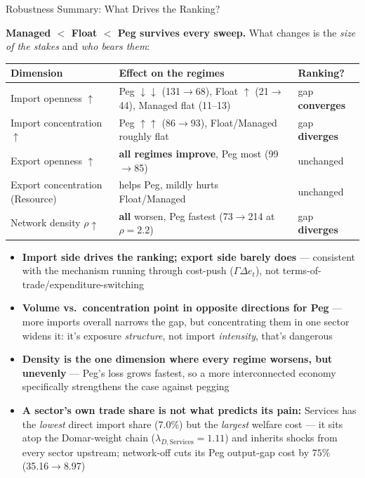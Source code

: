 \begin{frame}{Robustness Summary: What Drives the Ranking?}
\hypertarget{robustsummary}{}

\vspace{-6pt}
{\scriptsize \textbf{Managed $<$ Float $<$ Peg survives every sweep.} What changes is the \emph{size of the stakes} and \emph{who bears them}:}

\vspace{3pt}
{\tiny
\renewcommand{\arraystretch}{1.25}
\begin{tabular}{@{}p{2.2cm}p{4.9cm}p{2.4cm}@{}}
\toprule
\textbf{Dimension} & \textbf{Effect on the regimes} & \textbf{Ranking?} \\
\midrule
Import openness $\uparrow$ & Peg $\downarrow\downarrow$ (131$\to$68), Float $\uparrow$ (21$\to$44), Managed flat (11--13) & gap \textbf{converges} \\
Import concentration $\uparrow$ & Peg $\uparrow\uparrow$ (86$\to$93), Float/Managed roughly flat & gap \textbf{diverges} \\
Export openness $\uparrow$ & \textbf{all regimes improve}, Peg most (99$\to$85) & unchanged \\
Export concentration (Resource) & helps Peg, mildly hurts Float/Managed & unchanged \\
Network density $\rho\uparrow$ & \textbf{all} worsen, Peg fastest (73$\to$214 at $\rho{=}2.2$) & gap \textbf{diverges} \\
\bottomrule
\end{tabular}}

\vspace{3pt}
{\scriptsize
\begin{itemize}\setlength{\itemsep}{1.5pt}\setlength{\topsep}{0pt}
\item \textbf{Import side drives the ranking; export side barely does} --- consistent with the mechanism running through cost-push ($\Gamma\Delta e_t$), not terms-of-trade/expenditure-switching
\item \textbf{Volume vs.\ concentration point in opposite directions for Peg} --- more imports overall narrows the gap, but concentrating them in one sector widens it: it's exposure \emph{structure}, not import \emph{intensity}, that's dangerous
\item \textbf{Density is the one dimension where every regime worsens, but unevenly} --- Peg's loss grows fastest, so a more interconnected economy specifically strengthens the case against pegging
\item \textbf{A sector's own trade share is not what predicts its pain:} Services has the \emph{lowest} direct import share (7.0\%) but the \emph{largest} welfare cost --- it sits atop the Domar-weight chain ($\lambda_{D,\text{Services}}{=}1.11$) and inherits shocks from every sector upstream; network-off cuts its Peg output-gap cost by $75\%$ (35.16$\to$8.97)
\end{itemize}}

\end{frame}

